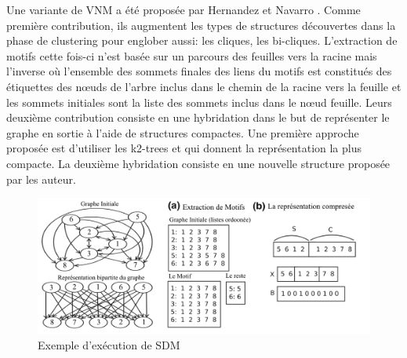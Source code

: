 	Une variante de VNM a été proposée par Hernandez et Navarro \citep{hernandez2014compressed}. Comme première contribution, ils augmentent les types de structures découvertes dans la phase de clustering pour englober aussi: les cliques, les bi-cliques. L'extraction de motifs cette fois-ci n'est basée sur un parcours des feuilles vers la racine mais l'inverse où  l'ensemble des sommets finales des liens du motifs est constitués des étiquettes des nœuds de l'arbre inclus dans le chemin de la racine vers la feuille et  les sommets initiales sont la liste des sommets inclus dans le nœud feuille. 
				Leurs deuxième contribution consiste en une hybridation dans le but de représenter le graphe en sortie à l'aide de structures compactes. Une première approche proposée est d'utiliser les  k2-trees \citep{brisaboa2009k} et qui donnent la représentation la plus compacte.  
				La deuxième hybridation consiste en une nouvelle structure proposée par les auteur.\\
				\begin{figure}[h]
					\includegraphics[scale=0.25]{ressources/image/VNM2_exemple.png} 
					\caption{Exemple d'exécution de SDM}
					\label{SDM}
				\end{figure}